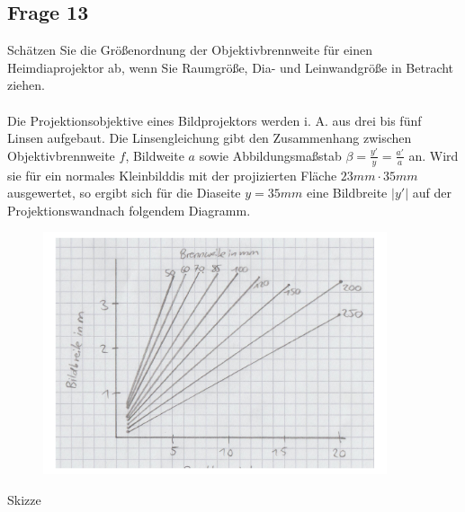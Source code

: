 \documentclass[a4paper,10pt]{scrartcl}
\begin{document}
	\subsection{Frage 13}
		Schätzen Sie die Größenordnung der Objektivbrennweite für einen Heimdiaprojektor ab, wenn Sie Raumgröße, Dia- und Leinwandgröße in Betracht ziehen.
		\\
		\\
		Die Projektionsobjektive eines Bildprojektors werden i. A. aus drei bis fünf Linsen aufgebaut. Die Linsengleichung gibt den Zusammenhang zwischen Objektivbrennweite $f$, Bildweite $a$ sowie Abbildungsmaßstab $\beta=\frac{y'}{y}=\frac{a'}{a}$ an. Wird sie für ein normales Kleinbilddis mit der projizierten Fläche $23 mm \cdot 35 mm$ ausgewertet, so ergibt sich für die Diaseite $y=35 mm$ eine Bildbreite $\left|y'\right|$ auf der Projektionswandnach folgendem Diagramm.
			\begin{figure}[h]
\centering
\includegraphics[width=0.9\textwidth]{./Bilder/og12}
\end{figure}
\FloatBarrier
	
			\begin{center}
			Skizze
			\end{center}
		
	
\end{document}
